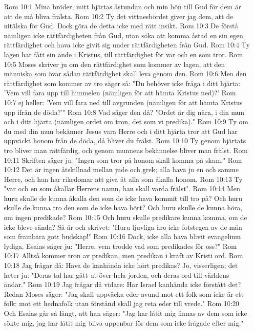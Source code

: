 Rom 10:1  Mina bröder, mitt hjärtas åstundan och min bön till Gud för dem är att de må bliva frälsta.
Rom 10:2  Ty det vittnesbördet giver jag dem, att de nitälska för Gud. Dock göra de detta icke med rätt insikt.
Rom 10:3  De förstå nämligen icke rättfärdigheten från Gud, utan söka att komma åstad en sin egen rättfärdighet och hava icke givit sig under rättfärdigheten från Gud.
Rom 10:4  Ty lagen har fått sin ände i Kristus, till rättfärdighet för var och en som tror.
Rom 10:5  Moses skriver ju om den rättfärdighet som kommer av lagen, att den människa som övar sådan rättfärdighet skall leva genom den.
Rom 10:6  Men den rättfärdighet som kommer av tro säger så: "Du behöver icke fråga i ditt hjärta: 'Vem vill fara upp till himmelen (nämligen för att hämta Kristus ned)?'
Rom 10:7  ej heller: 'Vem vill fara ned till avgrunden (nämligen för att hämta Kristus upp ifrån de döda?'"
Rom 10:8  Vad säger den då? "Ordet är dig nära, i din mun och i ditt hjärta (nämligen ordet om tron, det som vi predika)."
Rom 10:9  Ty om du med din mun bekänner Jesus vara Herre och i ditt hjärta tror att Gud har uppväckt honom från de döda, då bliver du frälst.
Rom 10:10  Ty genom hjärtats tro bliver man rättfärdig, och genom munnens bekännelse bliver man frälst.
Rom 10:11  Skriften säger ju: "Ingen som tror på honom skall komma på skam."
Rom 10:12  Det är ingen åtskillnad mellan jude och grek; alla hava ju en och samme Herre, och han har rikedomar att giva åt alla som åkalla honom.
Rom 10:13  Ty "var och en som åkallar Herrens namn, han skall varda frälst".
Rom 10:14  Men huru skulle de kunna åkalla den som de icke hava kommit till tro på? Och huru skulle de kunna tro den som de icke hava hört? Och huru skulle de kunna höra, om ingen predikade?
Rom 10:15  Och huru skulle predikare kunna komma, om de icke bleve sända? Så är och skrivet: "Huru ljuvliga äro icke fotstegen av de män som frambära gott budskap!"
Rom 10:16  Dock, icke alla hava blivit evangelium lydiga. Esaias säger ju: "Herre, vem trodde vad som predikades för oss?"
Rom 10:17  Alltså kommer tron av predikan, men predikan i kraft av Kristi ord.
Rom 10:18  Jag frågar då: Hava de kanhända icke hört predikas? Jo, visserligen; det heter ju: "Deras tal har gått ut över hela jorden, och deras ord till världens ändar."
Rom 10:19  Jag frågar då vidare: Har Israel kanhända icke förstått det? Redan Moses säger: "Jag skall uppväcka eder avund mot ett folk som icke är ett folk; mot ett hednafolk utan förstånd skall jag reta eder till vrede."
Rom 10:20  Och Esaias går så långt, att han säger: "Jag har låtit mig finnas av dem som icke sökte mig, jag har låtit mig bliva uppenbar för dem som icke frågade efter mig."
